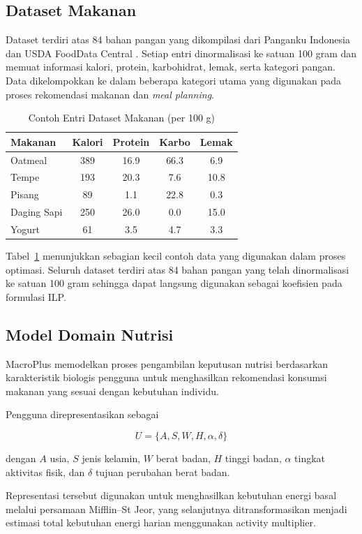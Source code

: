 \documentclass[conference]{IEEEtran}
\begin{document}
\subsection{Dataset Makanan}
Dataset terdiri atas 84 bahan pangan yang dikompilasi dari Panganku Indonesia dan USDA FoodData Central \cite{panganku,usda_fdc}. Setiap entri dinormalisasi ke satuan 100 gram dan memuat informasi kalori, protein, karbohidrat, lemak, serta kategori pangan. Data dikelompokkan ke dalam beberapa kategori utama yang digunakan pada proses rekomendasi makanan dan \textit{meal planning}.

\begin{table}[!ht]
\caption{Contoh Entri Dataset Makanan (per 100 g)}
\centering
\begin{tabular}{lcccc}
\toprule
Makanan & Kalori & Protein & Karbo & Lemak \\
\midrule
Oatmeal & 389 & 16.9 & 66.3 & 6.9 \\
Tempe & 193 & 20.3 & 7.6 & 10.8 \\
Pisang & 89 & 1.1 & 22.8 & 0.3 \\
Daging Sapi & 250 & 26.0 & 0.0 & 15.0 \\
Yogurt & 61 & 3.5 & 4.7 & 3.3 \\
\bottomrule
\end{tabular}
\label{tab:foodsample}
\end{table}

Tabel~\ref{tab:foodsample} menunjukkan sebagian kecil contoh data yang
digunakan dalam proses optimasi. Seluruh dataset terdiri atas 84 bahan
pangan yang telah dinormalisasi ke satuan 100 gram sehingga dapat
langsung digunakan sebagai koefisien pada formulasi ILP.

\subsection{Model Domain Nutrisi}

MacroPlus memodelkan proses pengambilan keputusan nutrisi berdasarkan karakteristik biologis pengguna untuk menghasilkan rekomendasi konsumsi makanan yang sesuai dengan kebutuhan individu.

Pengguna direpresentasikan sebagai

\[
U=\{A,S,W,H,\alpha,\delta\}
\]

dengan $A$ usia, $S$ jenis kelamin,
$W$ berat badan,
$H$ tinggi badan,
$\alpha$ tingkat aktivitas fisik,
dan $\delta$ tujuan perubahan berat badan.

Representasi tersebut digunakan untuk menghasilkan kebutuhan energi
basal melalui persamaan Mifflin--St Jeor, yang selanjutnya ditransformasikan
menjadi estimasi total kebutuhan energi harian menggunakan
activity multiplier.
\end{document}
